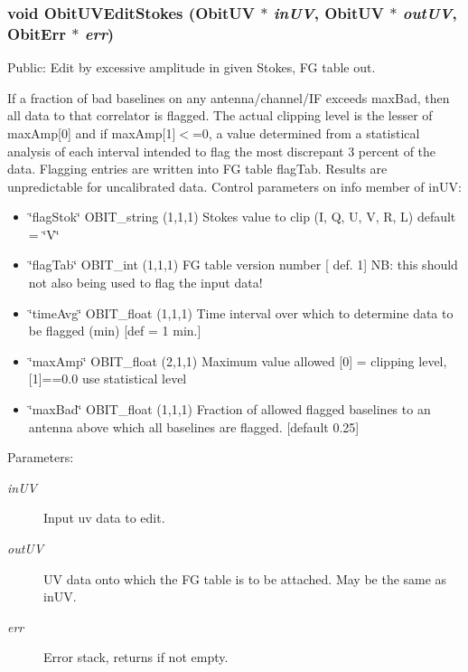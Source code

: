 \subsubsection{\setlength{\rightskip}{0pt plus 5cm}void Obit\-UVEdit\-Stokes ({\bf Obit\-UV} $\ast$ {\em in\-UV}, {\bf Obit\-UV} $\ast$ {\em out\-UV}, {\bf Obit\-Err} $\ast$ {\em err})}\label{ObitUVEdit_8c_a25}


Public: Edit by excessive amplitude in given Stokes, FG table out. 

If a fraction of bad baselines on any antenna/channel/IF exceeds max\-Bad, then all data to that correlator is flagged. The actual clipping level is the lesser of max\-Amp[0] and if max\-Amp[1]$<$=0, a value determined from a statistical analysis of each interval intended to flag the most discrepant 3 percent of the data. Flagging entries are written into FG table flag\-Tab. Results are unpredictable for uncalibrated data. Control parameters on info member of in\-UV: \begin{itemize}
\item \char`\"{}flag\-Stok\char`\"{} OBIT\_\-string (1,1,1) Stokes value to clip (I, Q, U, V, R, L) default = \char`\"{}V\char`\"{} \item \char`\"{}flag\-Tab\char`\"{} OBIT\_\-int (1,1,1) FG table version number [ def. 1] NB: this should not also being used to flag the input data! \item \char`\"{}time\-Avg\char`\"{} OBIT\_\-float (1,1,1) Time interval over which to determine data to be flagged (min) [def = 1 min.] \item \char`\"{}max\-Amp\char`\"{} OBIT\_\-float (2,1,1) Maximum value allowed [0] = clipping level, [1]==0.0 use statistical level \item \char`\"{}max\-Bad\char`\"{} OBIT\_\-float (1,1,1) Fraction of allowed flagged baselines to an antenna above which all baselines are flagged. [default 0.25]\end{itemize}
\begin{Desc}
\item[Parameters:]
\begin{description}
\item[{\em in\-UV}]Input uv data to edit. \item[{\em out\-UV}]UV data onto which the FG table is to be attached. May be the same as in\-UV. \item[{\em err}]Error stack, returns if not empty. \end{description}
\end{Desc}

